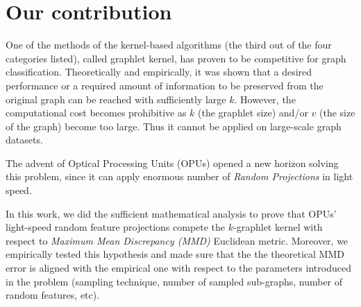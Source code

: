 \section{Our contribution}
One of the methods of the kernel-based algorithms (the third out of the four categories listed), called graphlet kernel, has proven to be competitive for graph classification. Theoretically and empirically, it was shown that a desired performance or a required amount of information to be preserved from the original graph can be reached with sufficiently large $k$. 
However,  the computational cost  becomes prohibitive as $k$ (the graphlet size) and/or $v$ (the size of the graph)  become too large. Thus it cannot be applied on large-scale graph datasets. 

The advent of Optical Processing Units (OPUs) opened a new horizon solving this problem, since it can apply enormous number of \emph{Random Projections} in light speed. 

In this work, we did the sufficient mathematical analysis to prove that OPUs' light-speed random feature projections compete the $k$-graphlet kernel with respect to \emph{Maximum Mean Discrepancy (MMD)} Euclidean metric. Moreover, we empirically tested this hypothesis and made sure that the the theoretical MMD error is aligned with the empirical one with respect to the parameters introduced in the problem (sampling technique, number of sampled sub-graphs, number of random features, etc). 






